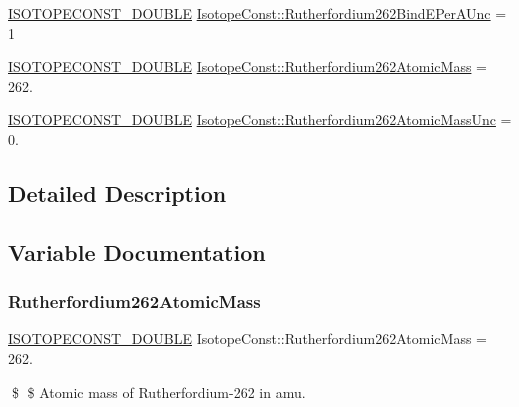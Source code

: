 \begin{DoxyCompactItemize}
\item 
\mbox{\hyperlink{group___isotope_const-_macros_ga8f45a7272ce02c0b4c65c44636ed719a}{I\+S\+O\+T\+O\+P\+E\+C\+O\+N\+S\+T\+\_\+\+D\+O\+U\+B\+LE}} \mbox{\hyperlink{group___isotope_const-_rutherfordium-_rf262_gaf383af91eb88df5b21c7ec7d3b70b0a7}{Isotope\+Const\+::\+Rutherfordium262\+Bind\+E\+Per\+A\+Unc}} = 1
\item 
\mbox{\hyperlink{group___isotope_const-_macros_ga8f45a7272ce02c0b4c65c44636ed719a}{I\+S\+O\+T\+O\+P\+E\+C\+O\+N\+S\+T\+\_\+\+D\+O\+U\+B\+LE}} \mbox{\hyperlink{group___isotope_const-_rutherfordium-_rf262_ga44726b58eb4e8e06843f7523b5e2a299}{Isotope\+Const\+::\+Rutherfordium262\+Atomic\+Mass}} = 262.
\item 
\mbox{\hyperlink{group___isotope_const-_macros_ga8f45a7272ce02c0b4c65c44636ed719a}{I\+S\+O\+T\+O\+P\+E\+C\+O\+N\+S\+T\+\_\+\+D\+O\+U\+B\+LE}} \mbox{\hyperlink{group___isotope_const-_rutherfordium-_rf262_ga440d983147f4516e04da5a2e5f620b44}{Isotope\+Const\+::\+Rutherfordium262\+Atomic\+Mass\+Unc}} = 0.
\end{DoxyCompactItemize}


\subsection{Detailed Description}


\subsection{Variable Documentation}
\mbox{\label{group___isotope_const-_rutherfordium-_rf262_ga44726b58eb4e8e06843f7523b5e2a299}} 
\subsubsection{\texorpdfstring{Rutherfordium262\+Atomic\+Mass}{Rutherfordium262AtomicMass}}
{\footnotesize\ttfamily \mbox{\hyperlink{group___isotope_const-_macros_ga8f45a7272ce02c0b4c65c44636ed719a}{I\+S\+O\+T\+O\+P\+E\+C\+O\+N\+S\+T\+\_\+\+D\+O\+U\+B\+LE}} Isotope\+Const\+::\+Rutherfordium262\+Atomic\+Mass = 262.}

\$ \$ Atomic mass of Rutherfordium-\/262 in amu. \mbox{\label{group___isotope_const-_rutherfordium-_rf262_ga440d983147f4516e04da5a2e5f620b44}} 
